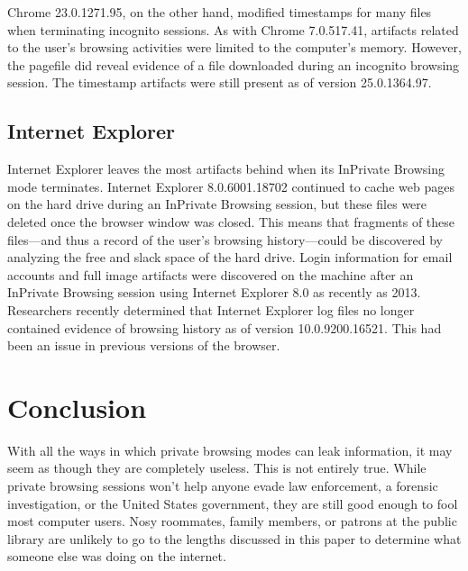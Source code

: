 \documentclass[pdftex,letterpaper,titlepage,12pt]{article}
\begin{document}
    Chrome 23.0.1271.95, on the other hand, modified timestamps for many files
    when terminating incognito sessions. As with Chrome 7.0.517.41, artifacts 
    related to the user's browsing activities were limited to the computer's 
    memory. However, the pagefile did reveal evidence of a file downloaded
    during an incognito browsing session.\cite{ohana13} The timestamp artifacts
    were still present as of version 25.0.1364.97.\cite{satvat13}
    
    \subsection{Internet Explorer}
    Internet Explorer leaves the most artifacts behind when its InPrivate
    Browsing mode terminates.\cite{ohana13} Internet Explorer 8.0.6001.18702
    continued to cache web pages on the hard drive during an InPrivate
    Browsing session, but these files were deleted once the browser window was
    closed. This means that fragments of these files---and thus a record of the
    user's browsing history---could be discovered by analyzing the free and
    slack space of the hard drive.\cite{said11} Login information for email
    accounts and full image artifacts were discovered on the machine after an 
    InPrivate Browsing session using Internet Explorer 8.0 as recently as 2013.
    \cite{ohana13} Researchers recently determined that Internet Explorer log 
    files no longer contained evidence of browsing history as of version 
    10.0.9200.16521. This had been an issue in previous versions of the 
    browser.\cite{satvat13}    


  \section{Conclusion}
  With all the ways in which private browsing modes can leak information, it
  may seem as though they are completely useless. This is not entirely true.
  While private browsing sessions won't help anyone evade law enforcement, a
  forensic investigation, or the United States government, they are still good
  enough to fool most computer users. Nosy roommates, family members, or
  patrons at the public library are unlikely to go to the lengths discussed in
  this paper to determine what someone else was doing on the internet.
\end{document}
